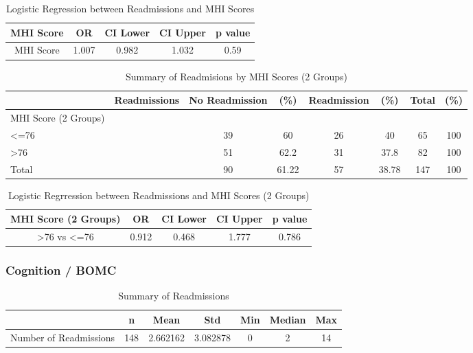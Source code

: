\documentclass[12pt,]{article}
\begin{document}
\begin{table}[!h]

\caption{\label{tab:unnamed-chunk-24}Logistic Regression between Readmissions and MHI Scores}
\centering
\begin{tabular}{ccccc}
\toprule
MHI Score & OR & CI Lower & CI Upper & p value\\
\midrule
\rowcolor{white}  MHI Score & 1.007 & 0.982 & 1.032 & 0.59\\
\bottomrule
\end{tabular}
\end{table}

\begin{table}[!h]

\caption{\label{tab:unnamed-chunk-24}Summary of Readmisions by MHI Scores (2 Groups)}
\centering
\begin{tabular}{>{\centering\arraybackslash}p{5cm}ccccccc}
\toprule
  & Readmissions & No Readmission & (\%) & Readmission & (\%) & Total & (\%)\\
\midrule
MHI Score (2 Groups) &  &  &  &  &  &  & \\
\rowcolor[HTML]{E3E5E7}  <=76 &  & 39 & 60 & 26 & 40 & 65 & 100\\
>76 &  & 51 & 62.2 & 31 & 37.8 & 82 & 100\\
\rowcolor[HTML]{E3E5E7}  Total &  & 90 & 61.22 & 57 & 38.78 & 147 & 100\\
\bottomrule
\end{tabular}
\end{table}

\begin{table}[!h]

\caption{\label{tab:unnamed-chunk-24}Logistic Regrression between Readmissions and MHI Scores (2 Groups)}
\centering
\begin{tabular}{ccccc}
\toprule
MHI Score (2 Groups) & OR & CI Lower & CI Upper & p value\\
\midrule
\rowcolor{white}  >76 vs <=76 & 0.912 & 0.468 & 1.777 & 0.786\\
\bottomrule
\end{tabular}
\end{table}

\pagebreak

\subsubsection{Cognition / BOMC}\label{cognition-bomc}

\begin{table}[!h]

\caption{\label{tab:unnamed-chunk-25}Summary of Readmissions}
\centering
\begin{tabular}{>{\raggedright\arraybackslash}p{5cm}cccccc}
\toprule
  & n & Mean & Std & Min & Median & Max\\
\midrule
\rowcolor{white}  Number of Readmissions & 148 & 2.662162 & 3.082878 & 0 & 2 & 14\\
\bottomrule
\end{tabular}
\end{table}
\end{document}
